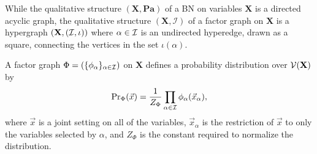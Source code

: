 {\begin{fulldefn}
\end{fulldefn}

While the qualitative structure $(\mathbf X, \mathbf{Pa})$ of a BN on variables $\mathbf X$ is a directed acyclic graph, the qualitative structure $(\mathbf X, \mathcal I)$ of a factor graph on $\mathbf X$ is
a hypergraph $(\mathbf X, (\cal I, \iota))$ where
	$\alpha \in \cal I$ is an undirected hyperedge, drawn as a
	square, connecting the vertices in the set $\iota(\alpha)$.  




A factor graph $\Phi = (\{\phi_\alpha\}_{\alpha \in \cal I})$ on $\mathbf X$ defines a probability distribution over $\mathcal V(\mathbf X)$ by 
\begin{align*}
			\Pr\nolimits_\Phi(\vec x) 
	= \frac{1}{Z_\Phi} \prod_{\alpha \in \cal I}
							\phi_\alpha(\vec x_{\alpha}), 
\end{align*}
where $\vec{x}$ is a joint setting on all of the variables, $\vec{x}_\alpha$ is the restriction of $\vec{x}$ to only the variables selected by $\alpha$, and $Z_\Phi$ is the constant required to normalize the distribution. 
	
}
